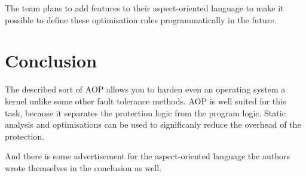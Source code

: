 \documentclass[paper=a4, fontsize=11pt]{scrartcl} %
\numberwithin{equation}{section} %
\numberwithin{figure}{section} %
\numberwithin{table}{section} %
\begin{document}
The team plans to add features to their aspect-oriented language to make it possible to define these optimisation rules programmatically in the future.

\section{Conclusion}

The described sort of AOP allows you to harden even an operating system a kernel unlike some other fault tolerance methods.
AOP is well suited for this task, because it separates the protection logic from the program logic.
Static analysis and optimisations can be used to significanly reduce the overhead of the protection.

And there is some advertisement for the aspect-oriented language the authors wrote themselves in the conclusion as well.

\printbibliography
\end{document}
